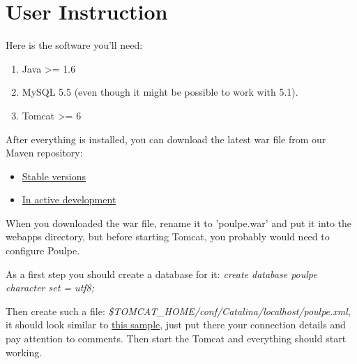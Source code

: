 \documentclass[11pt,a4paper,oneside]{article}
\begin{document}
\section{User Instruction}
Here is the software you'll need:
\begin{enumerate}
 \item Java \textgreater= 1.6
 \item MySQL 5.5 (even though it might be possible to work with 5.1). 
 \item Tomcat \textgreater= 6
\end{enumerate}
After everything is installed, you can download the latest war file from our Maven repository:
\begin{itemize}
 \item \href{http://repo.jtalks.org/content/repositories/releases/org/jtalks/poulpe/poulpe-web-view}{Stable versions}
 \item \href{http://repo.jtalks.org/content/repositories/deployment-pipeline/deployment-pipeline/poulpe}{In active development}
\end{itemize}
When you downloaded the war file, rename it to 'poulpe.war' and put it into the webapps directory, but before starting Tomcat, you probably would need to configure Poulpe. 

As a first step you should create a database for it: \emph{create database poulpe character set = utf8;}

Then create such a file: \emph{\$TOMCAT\_HOME/conf/Catalina/localhost/poulpe.xml}, it should look similar to \href{run:./poulpe.xml}{this sample}, just put there your connection details and pay attention to comments. Then start the Tomcat and everything should start working.
\end{document}
